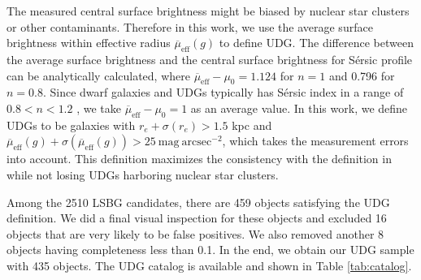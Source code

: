 \documentclass[twocolumn,astrosymb,twocolappendix]{aastex631}
\newcommand{\sbunit}{\mathrm{mag\ arcsec}^{-2}}
\newcommand{\sbeff}{\overline{\mu}_{\mathrm{eff}}(g)}
\newcommand{\sersic}{S\'ersic}
\begin{document}
\begin{CJK*}{UTF8}{gbsn}
The measured central surface brightness might be biased by nuclear star clusters \citep{Neumayer2020} or other contaminants. Therefore in this work, we use the average surface brightness within effective radius $\sbeff$ to define UDG. The difference between the average surface brightness and the central surface brightness for \sersic{} profile can be analytically calculated, where $\overline{\mu}_{\mathrm{eff}} - \mu_0 = 1.124$ for $n=1$ and 0.796 for $n=0.8$. Since dwarf galaxies and UDGs typically has \sersic{} index in a range of $0.8 < n < 1.2$ \citep{vanDokkum2015,ELVES-I}, we take $\overline{\mu}_{\mathrm{eff}} - \mu_0 = 1$ as an average value. In this work, we define UDGs to be galaxies with $r_e+\sigma(r_e) > 1.5$ kpc and $\sbeff + \sigma(\sbeff) > 25\ \sbunit$, which takes the measurement errors into account. This definition maximizes the consistency with the definition in \citet{vanDokkum2015} while not losing UDGs harboring nuclear star clusters.

Among the 2510 LSBG candidates, there are 459 objects satisfying the UDG definition. We did a final visual inspection for these objects and excluded 16 objects that are very likely to be false positives. We also removed another 8 objects having completeness less than 0.1. In the end, we obtain our UDG sample with 435 objects. The UDG catalog is available and shown in Table \ref{tab:catalog}. 

\vspace{1em}


\end{CJK*}
\end{document}
